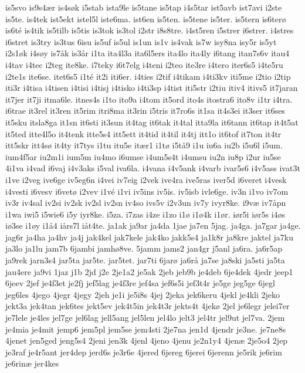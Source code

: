 {is5svo
is9s4ær
is4søk
i5stab
ista9le
is5tane
is5tap
i4s5tar
ist5avb
ist7avi
i2ste
is5te.
is4tek
ist5ekt
istel5l
iste6ma.
ist6en
is5ten.
is5tene
is5ter.
is5tern
is6terø
is6té
is4tik
is5tilb
is5tis
is3tok
is3tol
i2str
i8s8tre.
i4st5ren
i5strer
i6strer.
i4stres
i6stret
is3try
is3tus
6isu
is5uf
is5ul
is1un
is1v
is4vak
is7w
isy8na
isy5r
is5yt
i2s1øk
i4søy
is7åk
is3år
i1ta
ita4l3a
ita6l5ers
ita4lo
ita4ly
i6tang
itan7s6v
itau4
i4tav
i4tec
i2teg
ite8ke.
i7teky
i6t7elg
i4teni
i2teo
ite3re
i4tero
iter6s5
i4te5ru
i2te1s
ite6se.
itet6s5
i1té
it2i
iti6er.
i4ties
i2tif
i4tikam
i4ti3kv
iti5me
i2tio
i2tip
iti3r
i4tisa
i4tisen
i4tisi
i4tisj
i4tisko
i4ti3sp
i4tist
iti5str
i2tiu
itiv4
itivs5
it7jaran
it7jer
it7ji
itma6le.
itnes4s
i1to
ito9a
i4tom
it5ord
ito4s
itostra6
ito8v
i1tr
i4tra.
i6trae
it3rel
it3ren
it5rim
itri8ma
it3rin
i5tris
it7ro6s
it1sa
it4s3ei
it3ser
it6ses
it5sku
itsla8ga
it1sn
it6sti
it3sun
it4tag
it6tak
it4tal
itta9la
it6tann
it6tap
it4t5at
it5ted
itte4l5o
it4tenk
itte5s4
itt5ett
it4tid
it4til
it4tj
itt1o
it6tof
it7ton
it4tr
itt5skr
itt4sø
it4ty
it7tys
i1tu
itu5e
itær1
i1tø
i5tå9
i1u
iu6a
iu2b
i5u6l
i5um.
ium4f5ar
iu2m1i
ium5m
iu4mo
i6umse
i4um5s4t
i4umsu
iu2n
iu8p
i2ur
iu5se
4i1va
i4vad
i6vaj
i4v3aks
i5val
iva6la.
i4vana
i4v5ank
i4varb
ivar5s6
i4v5ass
ivat3t
i1ve
i2veg
ive6ge
iv5eg6n
i4vei
iv7eig
i2vek
ive4ra
ive5ras
iver5d
i6veret
i4vesk
i4vesti
i6vesv
i6vetø
i2vev
i1vé
i1vi
iv5ins
iv5is.
iv5isb
ivle6ge.
iv3n
i1vo
iv7om
iv3r
iv4sal
iv2si
iv2sk
iv2sl
iv2sn
iv4so
ivs5v
i2v3un
iv7y
ivyr8ke.
i9væ
iv7åpn
i1wa
iwi5
i5wie6
i5y
iyr8ke.
i5za.
i7zas
i4ze
i1zo
i1ø
i1ø4k
i1ør.
iør5i
iør5s
i4øs
iø3se
i1øy
i1å4
iårs7l
iåt4te.
ja1ak
ja9ar
ja4da
1jae
ja7en
5jag.
ja4ga.
ja7gar
ja4ge.
jag6r
ja4ha
ja4hv
ja4j
jak4kel
jak7kele
jak4ko
jakk5s4
ja1k8r
ja8kre
jaktel
ja7ku
ja3lo
ja1lu
jam7b
6jambi
jamhø8ve.
5jamm
jams2
jan4gr
j5anl
ja6ra.
ja6r5ap
ja9rek
jarn3s4
jar5ta
jar5te.
jar5tet.
jar7ti
6jarø
ja6rå
ja7se
ja8ski
ja5sti
ja5ta
jau4ere
ja9vi
1jaz
j1b
2jd
j2e
2je1a2
je5ak
2jeb
jeb9b
je4deb
6je4dek
4jedr
jeep1
6jeev
2jef
je4f3et
je2fj
jef5lag
je4f3re
jef4sa
jef6s5i
jef3t4r
je5ge
jeg5ge
6jegl
jeg6les
4jego
4jegr
4jegy
2jeh
je1i
je5i8s
4jej
2jeka
jek6keru
4jekl
je4kli
2jeko
jekt3a
jek4tan
jek6tes
jekt5ev
jek4t5in
jek4t3r
jekts4t
4jekø
2jel
je6legr
jelei7er
je7lele
je4les
jel7ge
jel6lag
jell5ang
jel5len
jel4lo
jelt3
jel4tr
jel9ut
jel7va.
2jem
je4mia
je4mit
jemp6
jem5pl
jem5se
jem4sti
2je7na
jen1d
4jendr
je3ne.
je7ne8s
4jenet
jen5ged
jeng5s4
2jeni
jen3k
4jenl
4jeno
4jenu
je2n1y4
4jenæ
2je5o4
2jep
je3raf
je4r5ant
jer4dep
jerd6s
je3r6e
4jered
6jereg
6jerei
6jerenn
je5rik
je6rim
je6rinæ
jer4kes
}
